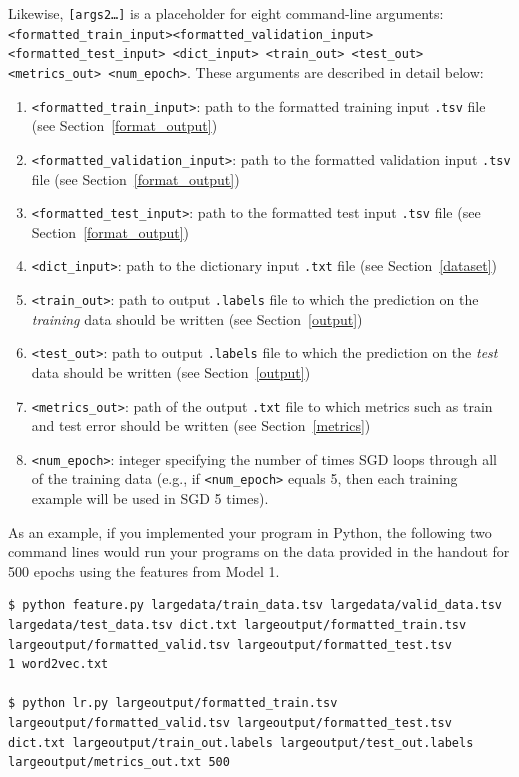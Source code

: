\documentclass[11pt,addpoints,answers]{exam}
\begin{document}
Likewise, \texttt{[args2\dots]} is a placeholder for eight command-line arguments: \texttt{<formatted\_train\_input>}\newline \texttt{<formatted\_validation\_input> <formatted\_test\_input> <dict\_input> <train\_out> \newline <test\_out> <metrics\_out> <num\_epoch>}. These arguments are described in detail below:
\begin{enumerate}
    \item \texttt{<formatted\_train\_input>}: path to the formatted training input \texttt{.tsv} file (see Section~\ref{format_output})
    \item \texttt{<formatted\_validation\_input>}: path to the formatted validation input \texttt{.tsv} file (see Section~\ref{format_output})
    \item \texttt{<formatted\_test\_input>}: path to the formatted test input \texttt{.tsv} file (see Section~\ref{format_output})
    \item \texttt{<dict\_input>}: path to the dictionary input \texttt{.txt} file (see Section~\ref{dataset})
    \item \texttt{<train\_out>}: path to output \texttt{.labels} file to which the prediction on the \emph{training} data should be written (see Section~\ref{output})
    \item \texttt{<test\_out>}: path to output \texttt{.labels} file to which the prediction on the \emph{test} data should be written (see Section~\ref{output})
    \item \texttt{<metrics\_out>}: path of the output \texttt{.txt} file to which metrics such as train and test error should be written (see Section~\ref{metrics})
    \item \texttt{<num\_epoch>}: integer specifying the number of times SGD loops through all of the training data (e.g., if \texttt{<num\_epoch>} equals 5, then each training example will be used in SGD 5 times). 
\end{enumerate}

As an example, if you implemented your program in Python, the following two command lines would run your programs on the data provided in the handout for 500 epochs using the features from Model 1.

\begin{lstlisting}[language=Shell]
$ python feature.py largedata/train_data.tsv largedata/valid_data.tsv
largedata/test_data.tsv dict.txt largeoutput/formatted_train.tsv
largeoutput/formatted_valid.tsv largeoutput/formatted_test.tsv
1 word2vec.txt

$ python lr.py largeoutput/formatted_train.tsv 
largeoutput/formatted_valid.tsv largeoutput/formatted_test.tsv 
dict.txt largeoutput/train_out.labels largeoutput/test_out.labels 
largeoutput/metrics_out.txt 500

\end{lstlisting}
\end{document}
